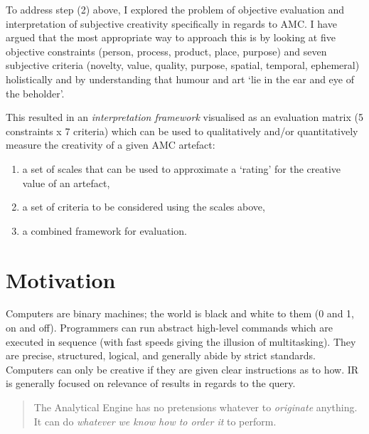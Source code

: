 To address step (2) above, I explored the problem of objective evaluation and interpretation of subjective creativity specifically in regards to \ac{AMC}. I have argued that the most appropriate way to approach this is by looking at five objective constraints (person, process, product, place, purpose) and seven subjective criteria (novelty, value, quality, purpose, spatial, temporal, ephemeral) holistically and by understanding that humour and art `lie in the ear and eye of the beholder'.

This resulted in an \emph{interpretation framework} visualised as an evaluation matrix (\num{5} constraints x \num{7} criteria) which can be used to qualitatively and/or quantitatively measure the creativity of a given \ac{AMC} artefact:

\begin{enumerate}
  \item a set of scales that can be used to approximate a `rating' for the creative value of an artefact,
  \item a set of criteria to be considered using the scales above,
  \item a combined framework for evaluation.
\end{enumerate}


\section{Motivation}

Computers are binary machines; the world is black and white to them (0 and 1, on and off). Programmers can run abstract high-level commands which are executed in sequence (with fast speeds giving the illusion of multitasking). They are precise, structured, logical, and generally abide by strict standards. Computers can only be creative if they are given clear instructions as to how. \acl{IR} is generally focused on relevance of results in regards to the query.

\begin{quotation}
  The Analytical Engine has no pretensions whatever to \emph{originate} anything. It can do \emph{whatever we know how to order it} to perform. 
\end{quotation}

